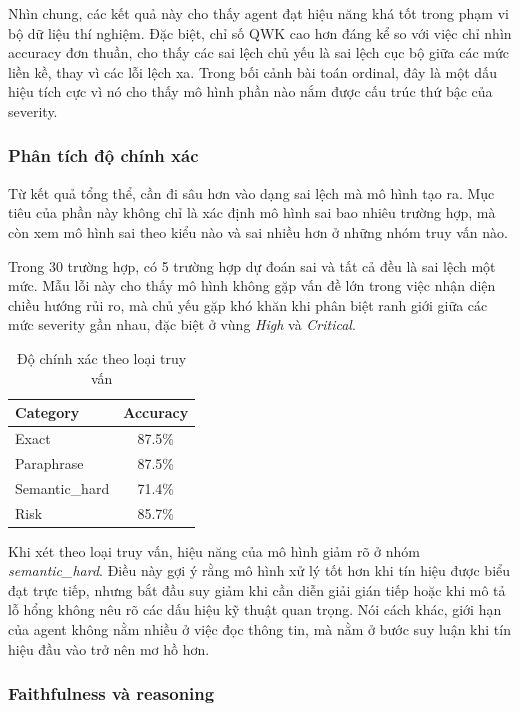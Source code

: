 Nhìn chung, các kết quả này cho thấy agent đạt hiệu năng khá tốt trong phạm vi bộ dữ liệu thí nghiệm. Đặc biệt, chỉ số QWK cao hơn đáng kể so với việc chỉ nhìn accuracy đơn thuần, cho thấy các sai lệch chủ yếu là sai lệch cục bộ giữa các mức liền kề, thay vì các lỗi lệch xa. Trong bối cảnh bài toán ordinal, đây là một dấu hiệu tích cực vì nó cho thấy mô hình phần nào nắm được cấu trúc thứ bậc của severity.

\subsubsection*{Phân tích độ chính xác}

Từ kết quả tổng thể, cần đi sâu hơn vào dạng sai lệch mà mô hình tạo ra. Mục tiêu của phần này không chỉ là xác định mô hình sai bao nhiêu trường hợp, mà còn xem mô hình sai theo kiểu nào và sai nhiều hơn ở những nhóm truy vấn nào.

Trong 30 trường hợp, có 5 trường hợp dự đoán sai và tất cả đều là sai lệch một mức. Mẫu lỗi này cho thấy mô hình không gặp vấn đề lớn trong việc nhận diện chiều hướng rủi ro, mà chủ yếu gặp khó khăn khi phân biệt ranh giới giữa các mức severity gần nhau, đặc biệt ở vùng \textit{High} và \textit{Critical}.

\begin{table}[!htb]
\centering
\begin{tabular}{l c}
\hline
Category & Accuracy \\
\hline
Exact & 87.5\% \\
Paraphrase & 87.5\% \\
Semantic\_hard & 71.4\% \\
Risk & 85.7\% \\
\hline
\end{tabular}
\caption{Độ chính xác theo loại truy vấn}
\label{tab:risk_by_querytype}
\end{table}

Khi xét theo loại truy vấn, hiệu năng của mô hình giảm rõ ở nhóm \textit{semantic\_hard}. Điều này gợi ý rằng mô hình xử lý tốt hơn khi tín hiệu được biểu đạt trực tiếp, nhưng bắt đầu suy giảm khi cần diễn giải gián tiếp hoặc khi mô tả lỗ hổng không nêu rõ các dấu hiệu kỹ thuật quan trọng. Nói cách khác, giới hạn của agent không nằm nhiều ở việc đọc thông tin, mà nằm ở bước suy luận khi tín hiệu đầu vào trở nên mơ hồ hơn.

\subsubsection*{Faithfulness và reasoning}

